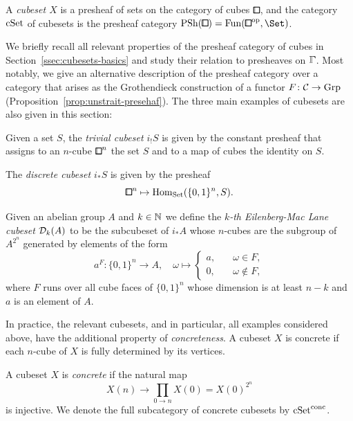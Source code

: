 \begin{definition*}
A \emph{cubeset $X$} is a presheaf of sets on the category of cubes $\bbox$,
and the category $\mathrm{cSet}$ of cubesets is the presheaf category $\PSh(\bbox)=\Fun(\bbox^\op,\Set)$.
\end{definition*}

We briefly recall all relevant properties of the presheaf category of cubes in Section~\ref{ssec:cubesets-basics} and study their relation to presheaves on $\bbGamma$.
Most notably, we give an alternative description of the presheaf category
over a category that arises as the Grothendieck construction of a functor $F\colon\mathcal{C}\to\mathrm{Grp}$
(Proposition~\ref{prop:unstrait-presehaf}).
The three main examples of cubesets are also given in this section:

\begin{example*}
Given a set $S$, the \emph{trivial cubeset $i_!S$} is given by the constant presheaf
that assigns to an $n$-cube ${\bbox}^n$ the set $S$ and to a map of cubes the identity on $S$.

The \emph{discrete cubeset $i_\ast S$} is given by the presheaf
\[
    {\bbox}^n\mapsto\hom_{\set}(\{0,1\}^n,S).
\]
\end{example*}

\begin{example*}
Given an abelian group $A$ and $k\in{\mathbb{N}}$ we define the \emph{$k$-th Eilenberg-Mac Lane cubeset $\mathcal{D}_k(A)$} to be the subcubeset of $i_\ast A$ whose $n$-cubes are the subgroup of $A^{2^n}$ generated by elements of the form
\[
    a^F\colon\{0,1\}^n\to A,\quad\omega\mapsto\begin{cases}
        a,\quad & \omega\in F, \\
        0,\quad & \omega\notin F,
    \end{cases}
\]
where $F$ runs over all cube faces of $\{0,1\}^n$
whose dimension is at least $n-k$ and $a$ is an element of $A$.
\end{example*}

In practice, the relevant cubesets, and in particular, all examples considered above,
have the additional property of \emph{concreteness}.
A cubeset $X$ is concrete if each $n$-cube of $X$ is fully determined by its vertices.

\begin{definition*}
A cubeset $X$ is \emph{concrete} if the natural map
\[
    X(n) \to \prod_{0\to n} X(0) = X(0)^{2^n}
\]
is injective.
We denote the full subcategory of concrete cubesets by $\mathrm{cSet}^\mathrm{conc}$.
\end{definition*}

